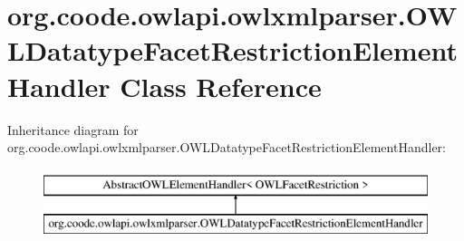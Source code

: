 \hypertarget{classorg_1_1coode_1_1owlapi_1_1owlxmlparser_1_1_o_w_l_datatype_facet_restriction_element_handler}{\section{org.\-coode.\-owlapi.\-owlxmlparser.\-O\-W\-L\-Datatype\-Facet\-Restriction\-Element\-Handler Class Reference}
\label{classorg_1_1coode_1_1owlapi_1_1owlxmlparser_1_1_o_w_l_datatype_facet_restriction_element_handler}
}
Inheritance diagram for org.\-coode.\-owlapi.\-owlxmlparser.\-O\-W\-L\-Datatype\-Facet\-Restriction\-Element\-Handler\-:\begin{figure}[H]
\begin{center}
\leavevmode
\includegraphics[height=2.000000cm]{classorg_1_1coode_1_1owlapi_1_1owlxmlparser_1_1_o_w_l_datatype_facet_restriction_element_handler}
\end{center}
\end{figure}
